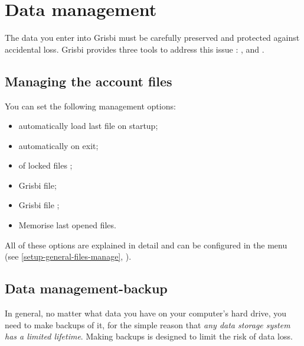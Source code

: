 
\chapter{Data management\label{datamanagement}}

The data you enter into Grisbi must be carefully preserved and protected against accidental loss. Grisbi provides three tools to address this issue : ,  and .

\section{Managing the account files\label{datamanagement-files}}

You can set the following management options:

\begin{itemize}
	\item automatically load last file on startup;
	\item automatically on exit;
	\item {} of locked files ;
	\item {} Grisbi file;
	\item{} Grisbi file ;
	\item Memorise last opened files.
\end{itemize}

All of these options are explained in detail and can be configured in the  menu (see \vref{setup-general-files-manage}, ).


\section{Data management-backup\label{datamanagement-backup}}

In general, no matter what data you have on your computer's hard drive, you need to make backups of it, for the simple reason that \emph{any data storage system has a limited lifetime}. Making backups is designed to limit the risk of data loss. 

